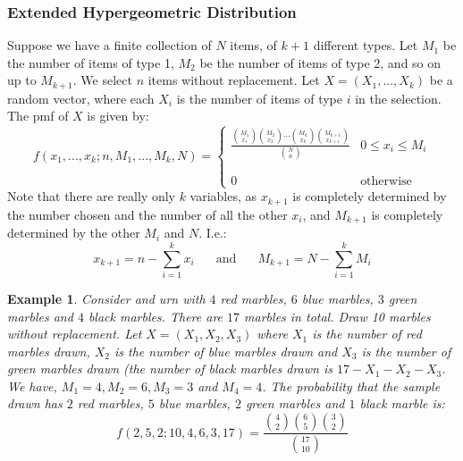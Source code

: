 \documentclass[12pt]{article} %
\newtheorem{example}{Example}
\begin{document}
\subsubsection{Extended Hypergeometric Distribution}
Suppose we have a finite collection of $N$ items, of $k+1$ different types. Let $M_1$ be the number of items of type 1, $M_2$ be the number of items of type 2, and so on up to $M_{k+1}$. We select $n$ items without replacement. Let $X=(X_1,...,X_k)$ be a random vector, where each $X_i$ is the number of items of type $i$ in the selection. The pmf of $X$ is given by:
$$f(x_1,...,x_k;n,M_1,...,M_k,N)=\left\{\begin{matrix}\frac{{M_1\choose{x_1}}{M_2\choose{x_2}}\cdots {M_k\choose{x_k}}{M_{k+1}\choose{x_{k+1}}}}{{N\choose{n}}}& 0\leq x_i\leq M_i\\\\\\ 0&\textrm{otherwise}\end{matrix}\right.$$
Note that there are really only $k$ variables, as $x_{k+1}$ is completely determined by the number chosen and the number of all the other $x_i$, and $M_{k+1}$ is completely determined by the other $M_i$ and $N$. I.e.:
$$x_{k+1} = n-\sum_{i=1}^k x_i \;\;\;\;\;\textrm{ and } \;\;\;\;\; M_{k+1} = N- \sum_{i=1}^k M_i$$
\begin{example}
Consider and urn with $4$ red marbles, $6$ blue marbles, $3$ green marbles and $4$ black marbles. There are $17$ marbles in total. Draw 10 marbles without replacement. Let $X=(X_1,X_2,X_3)$ where $X_1$ is the number of red marbles drawn, $X_2$ is the number of  blue marbles drawn and $X_3$ is the number of green marbles drawn (the number of black marbles drawn is $17-X_1-X_2-X_3$. We have, $M_1=4,M_2=6,M_3=3$ and $M_4 =4$. The probability that the sample drawn has $2$ red marbles, $5$ blue marbles, $2$ green marbles and $1$ black marble is:
$$f(2,5,2;10,4,6,3,17) =  \frac{{4\choose{2}}{6\choose{5}}{3\choose{2}}}{{17\choose{10}}}$$
\end{example}
\end{document}
